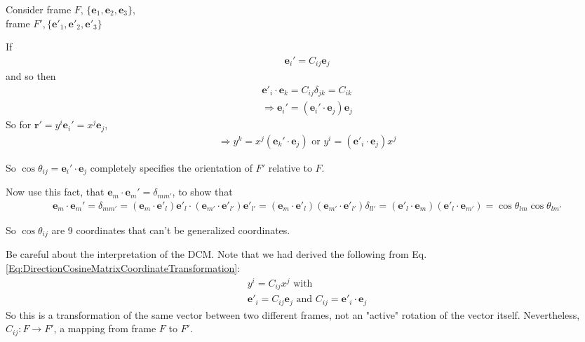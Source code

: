 \documentclass[10pt]{amsart}
\begin{document}
\begin{multicols*}{2}
Consider frame $F, \, \lbrace \mathbf{e}_1, \mathbf{e}_2, \mathbf{e}_3 \rbrace$, \\
\phantom{Consider} frame $F', \lbrace \mathbf{e}'_1, \mathbf{e}'_2, \mathbf{e}'_3 \rbrace$ 

If 
\[
\begin{gathered}
	\mathbf{e}_i' = C_{ij} \mathbf{e}_j
\end{gathered}
\]
and so then
\[
\begin{gathered}
	\mathbf{e}'_i \cdot \mathbf{e}_k = C_{ij} \delta_{jk} = C_{ik} \\
	\Longrightarrow \mathbf{e}_i' = (\mathbf{e}_i' \cdot \mathbf{e}_j ) \mathbf{e}_j
\end{gathered}
\]
So for $\mathbf{r}' = y^i \mathbf{e}_i' = x^j \mathbf{e}_j$, 
\begin{equation}\label{Eq:DirectionCosineMatrixCoordinateTransformation}
\begin{gathered}
	\Longrightarrow y^k = x^j (\mathbf{e}_k' \cdot \mathbf{e}_j )  \text{ or } y^i = (\mathbf{e}'_i \cdot \mathbf{e}_j) x^j
\end{gathered}
\end{equation}

So $\cos{\theta_{ij}} = \mathbf{e}_i' \cdot \mathbf{e}_j$ completely specifies the orientation of $F'$ relative to $F$.

Now use this fact, that $\mathbf{e}_m \cdot \mathbf{e}_m' = \delta_{mm'}$, to show that
\[
\begin{gathered}
	\mathbf{e}_m \cdot \mathbf{e}_m' = \delta_{mm'} = (\mathbf{e}_m \cdot \mathbf{e}'_l ) \mathbf{e}'_l \cdot (\mathbf{e}_{m'} \cdot \mathbf{e}'_{l'}) \mathbf{e}'_{l'} = (\mathbf{e}_m \cdot \mathbf{e}'_l)(\mathbf{e}_{m'} \cdot \mathbf{e}'_{l'}) \delta_{ll'} = (\mathbf{e}'_l \cdot \mathbf{e}_m )( \mathbf{e}'_l \cdot \mathbf{e}_{m'}) = \cos{\theta_{lm}} \cos{\theta_{lm'} }
\end{gathered}
\]

So $\cos{\theta_{ij}}$ are 9 coordinates that can't be generalized coordinates.

Be careful about the interpretation of the DCM. Note that we had derived the following from Eq. \ref{Eq:DirectionCosineMatrixCoordinateTransformation}:
\begin{equation}
\begin{gathered}
	\boxed{ y^i = C_{ij} x^j } \text{ with } \\
	\mathbf{e}'_i = C_{ij} \mathbf{e}_j \text{ and } \boxed{ C_{ij} = \mathbf{e}'_i \cdot \mathbf{e}_j }
\end{gathered}	
\end{equation}
So this is a transformation of the same vector between two different frames, not an "active" rotation of the vector itself. Nevertheless, $C_{ij} : F \to F'$, a mapping from frame $F$ to $F'$.


\end{multicols*}
\end{document}

